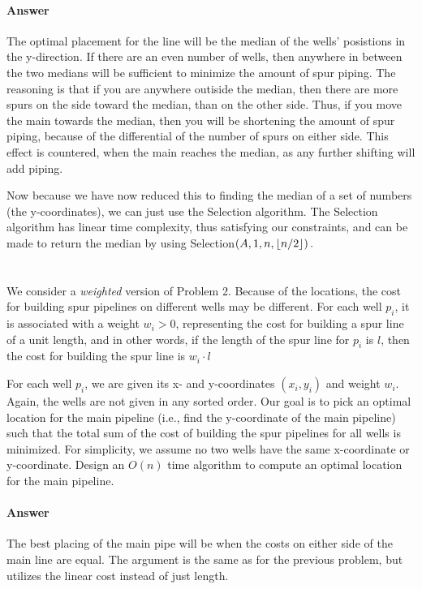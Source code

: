 \documentclass{article}
\DeclarePairedDelimiter{\floor}{\lfloor}{\rfloor}
\begin{document}
\paragraph{Answer}
The optimal placement for the line will be the median of the wells'
posistions in the y-direction.  If there are an even number of wells,
then anywhere in between the two medians will be sufficient to
minimize the amount of spur piping.  The reasoning is that if you are
anywhere outiside the median, then there are more spurs on the side
toward the median, than on the other side.  Thus, if you move the main
towards the median, then you will be shortening the amount of spur
piping, because of the differential of the number of spurs on either
side. This effect is countered, when the main reaches the median, as
any further shifting will add piping.

Now because we have now reduced this to finding the median of a set of
numbers (the y-coordinates), we can just use the Selection algorithm.
The Selection algorithm has linear time complexity, thus satisfying
our constraints, and can be made to return the median by using
{\sc Selection}$\left(A,1,n,\floor{n/2}\right).$


\section{}
We consider a \emph{weighted} version of Problem 2. Because of the
locations, 
the cost for building spur pipelines on different wells may be
different. For each well $p_i$, it is associated with a weight $w_i >
0$, representing the cost for building a spur line of a unit length,
and in other words, if the length of the spur line for $p_i$ is $l$,
then the cost for building the spur line is $w_i\cdot l$

For each well $p_i$, we are given its x- and y-coordinates $(x_i,
y_i)$ and weight $w_i$. Again, the wells are not given in any sorted
order. Our goal is to pick an optimal location for the main pipeline
(i.e., find the y-coordinate of the main pipeline) such that the total
sum of the cost of building the spur pipelines for all wells is
minimized. For simplicity, we assume no two wells have the same
x-coordinate or y-coordinate. Design an $O(n)$ time algorithm to
compute an optimal location for the main pipeline.  

\paragraph{Answer}
The best placing of the main pipe will be when the costs on either
side of the main line are equal.  The argument is the same as for the
previous problem, but utilizes the linear cost instead of just
length. 
\end{document}
